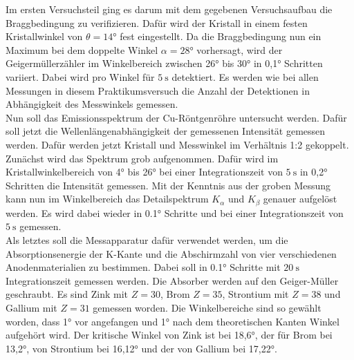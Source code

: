 \noindent Im ersten Versuchsteil ging es darum mit dem gegebenen Versuchsaufbau die 
Braggbedingung zu verifizieren. Dafür wird der Kristall in einem festen Kristallwinkel von $\theta=14°$
fest eingestellt. Da die Braggbedingung nun ein Maximum bei dem doppelte Winkel $\alpha=28°$
vorhersagt, wird der Geigermüllerzähler im Winkelbereich zwischen 26° bis 30° in 0,1° Schritten 
variiert. Dabei wird pro Winkel für $\qty{5}{\s}$ detektiert. Es werden wie bei allen Messungen in diesem
Praktikumsversuch die Anzahl der Detektionen in Abhängigkeit des Messwinkels gemessen.
\\
\noindent Nun soll das Emissionsspektrum der Cu-Röntgenröhre untersucht werden.
Dafür soll jetzt die Wellenlängenabhängigkeit der gemessenen Intensität gemessen werden. Dafür werden
jetzt Kristall und Messwinkel im Verhältnis 1:2 gekoppelt. 
Zunächst wird das Spektrum grob aufgenommen. Dafür wird im Kristallwinkelbereich von 4° bis 26°
bei einer Integrationszeit von $\qty{5}{\s}$ in 0,2° Schritten die Intensität gemessen.
Mit der Kenntnis aus der groben Messung kann nun im Winkelbereich  das Detailspektrum 
$K_\alpha$ und $K_\beta$ genauer aufgelöst werden. Es wird dabei wieder in 0.1° Schritte 
und bei einer Integrationszeit von $\qty{5}{\s}$ gemessen.
\\
\noindent Als letztes soll die Messapparatur dafür verwendet werden, um die Absorptionsenergie der K-Kante und
die Abschirmzahl von vier verschiedenen Anodenmaterialien zu bestimmen. Dabei soll in 0.1° Schritte mit $\qty{20}{\s}$ 
Integrationszeit gemessen werden. Die Absorber werden auf den Geiger-Müller geschraubt. Es sind Zink mit $Z=30$, Brom $Z=35$,
Strontium mit $Z=38$ und Gallium mit $Z=31$ gemessen worden. Die Winkelbereiche sind so gewählt worden, dass 1° vor angefangen und 1° nach dem 
theoretischen Kanten Winkel aufgehört wird. Der kritische Winkel von Zink ist bei 18,6°, der für Brom bei 13,2°, von Strontium bei 16,12° und 
der von Gallium bei 17,22°.




